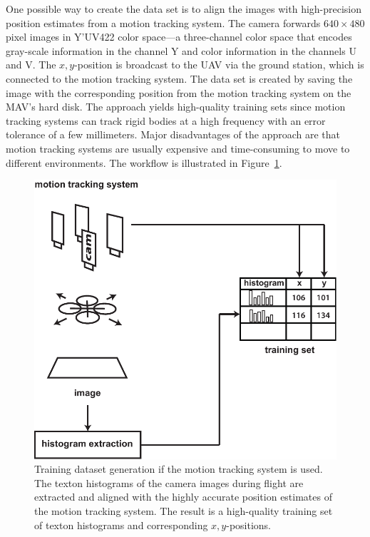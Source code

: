 \documentclass[11pt]{report}
\begin{document}
One possible way to create the data set is to align the images with
high-precision position estimates from a motion tracking system.  The
camera forwards $640 \times 480$ pixel images in Y'UV422 color
space---a three-channel color space that encodes gray-scale
information in the channel Y and color information in the channels U
and V.
The $x,y$-position is broadcast to the UAV via the ground station,
which is connected to the motion tracking system.  The data set is
created by saving the image with the corresponding position from the
motion tracking system on the MAV's hard disk. The approach yields
high-quality training sets since motion tracking systems can track
rigid bodies at a high frequency with an error tolerance of a few
millimeters. Major disadvantages of the approach are that motion
tracking systems are usually expensive and time-consuming to move to
different environments. The workflow is illustrated in
Figure~\ref{fig:overviewn}.
\begin{figure}[h]
\begin{center}
\includegraphics[width=0.56\columnwidth]{overview_new}
\caption{{\label{fig:overviewn}Training dataset generation if the motion tracking system is
    used. The texton histograms of the camera images during flight are
    extracted and aligned with the highly accurate position estimates
    of the motion tracking system. The result is a high-quality
    training set of texton histograms and corresponding
    $x,y$-positions.%
  }}
\end{center}
\end{figure}
\end{document}
